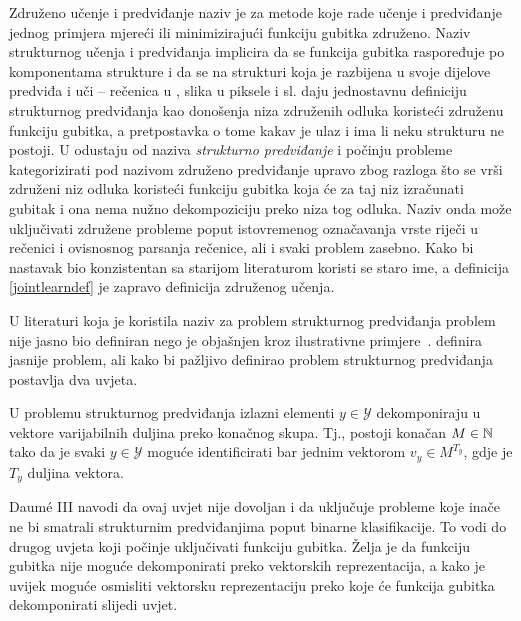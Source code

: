 Združeno učenje i predviđanje  naziv je za
metode koje rade učenje i predviđanje jednog primjera mjereći ili minimizirajući
funkciju gubitka združeno. Naziv strukturnog učenja i predviđanja
 implicira da se funkcija gubitka
raspoređuje po komponentama strukture i da se na strukturi koja je razbijena u
svoje dijelove predviđa i uči -- rečenica u , slika u piksele
i sl. \citet{daume14lts} daju jednostavnu definiciju strukturnog predviđanja kao
donošenja niza združenih odluka koristeći združenu funkciju gubitka, a
pretpostavka o tome kakav je ulaz i ima li neku strukturu ne postoji. U
\citep{daume15naacltalk} odustaju od naziva \emph{strukturno predviđanje} i
počinju probleme kategorizirati pod nazivom združeno predviđanje upravo zbog
razloga što se vrši združeni niz odluka koristeći funkciju gubitka koja će za
taj niz izračunati gubitak i ona nema nužno dekompoziciju preko niza tog odluka.
Naziv onda može uključivati združene probleme poput istovremenog označavanja
vrste riječi u rečenici i ovisnosnog parsanja rečenice, ali i svaki problem
zasebno. Kako bi nastavak bio konzistentan sa starijom literaturom koristi se
staro ime, a definicija \ref{jointlearndef} je zapravo definicija združenog
učenja.

U literaturi koja je koristila naziv za problem strukturnog predviđanja problem
nije jasno bio definiran nego je objašnjen kroz ilustrativne
primjere~\citep{mccallum2000maximum, punyakanok2001use, lafferty2001conditional,
collins2002discriminative, taskar2003maximum, mcallester2004case,
tsochantaridis2005large}. \citet{daume06thesis} definira jasnije problem, ali
kako bi pažljivo definirao problem strukturnog predviđanja postavlja dva uvjeta.

\begin{condition} \label{uvjet1}

  U problemu strukturnog predviđanja izlazni elementi $y \in \mathcal{Y}$
  dekomponiraju u vektore varijabilnih duljina preko konačnog skupa. Tj.,
  postoji konačan $M \in \mathbb{N}$ tako da je svaki $y \in \mathcal{Y}$ moguće
  identificirati bar jednim vektorom $v_y \in M^{T_y}$, gdje je $T_y$ duljina
  vektora.

\end{condition}

Daum\'e III navodi da ovaj uvjet nije dovoljan i da uključuje probleme koje
inače ne bi smatrali strukturnim predviđanjima poput binarne klasifikacije. To
vodi do drugog uvjeta koji počinje uključivati funkciju gubitka. Želja je da
funkciju gubitka nije moguće dekomponirati preko vektorskih reprezentacija, a
kako je uvijek moguće osmisliti vektorsku reprezentaciju preko koje će funkcija
gubitka dekomponirati slijedi uvjet.

